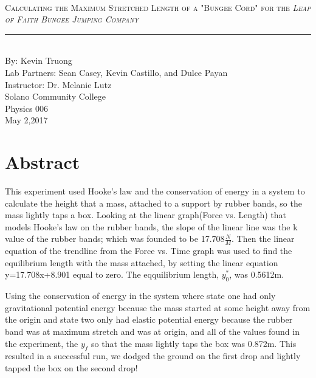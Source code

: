 \documentclass[aps,letterpaper,11pt]{revtex4}
\newcommand{\labno}{10}
\newcommand{\labtitle}{Calculating the Maximum Stretched Length of a "Bungee Cord" for the \textit{Leap of Faith Bungee Jumping Company}}
\newcommand{\authorname}{Kevin Truong}
\newcommand{\professor}{Dr. Melanie Lutz}
\newcommand{\classno}{Physics 006}
\newcommand{\labpartners}{Sean Casey, Kevin Castillo, and Dulce Payan}
\newcommand{\submitdate}{May 2,2017}
\begin{document}
\begin{titlepage}
\begin{center}
\hspace{-136mm}\boxed{{\Large \textsc{Lab No. \labno}}}\\\vspace{30mm}
{\Large \textsc{\labtitle} \\ \vspace{4pt}}
\rule[13pt]{\textwidth}{1pt}\\ \vspace{150pt}
{\large By: \authorname \\ \vspace{10pt}}
Lab Partners: \labpartners \\
Instructor: \professor \vspace{10pt} \\
Solano Community College\\ \classno \\ \vspace{10pt}
\submitdate
\end{center}
\end{titlepage}

\section{Abstract}

This experiment used Hooke's law and the conservation of energy in a system to calculate the height that a mass, attached to a support by rubber bands, so the mass lightly taps a box. Looking at the linear graph(Force vs. Length) that models Hooke's law on the rubber bands, the slope of the linear line was the k value of the rubber bands; which was founded to be 17.708$\frac{N}{M}$. Then the linear equation of the trendline from the Force vs. Time graph was used to find the equilibrium length with the mass attached, by setting the linear equation y=17.708x+8.901 equal to zero. The eqquilibrium length, $y_0^*$, was 0.5612m. 

Using the conservation of energy in the system where state one had only gravitational potential energy because the mass started at some height away from the origin and state two only had elastic potential energy because the rubber band was at maximum stretch and was at origin, and all of the values found in the experiment, the $y_f$ so that the mass lightly taps the box was 0.872m. This resulted in a successful run, we dodged the ground on the first drop and lightly tapped the box on the second drop! 
\end{document}
